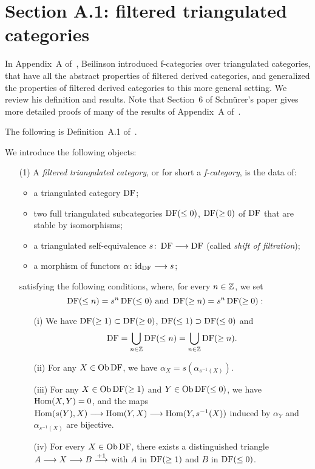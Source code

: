 \section{Section A.1: filtered triangulated categories}

In Appendix~A of~\cite{Be1}, Beilinson introduced f-categories over triangulated categories, that have all the abstract properties of filtered
derived categories, and generalized the properties of filtered derived categories to this more general setting. We review his definition and results.
Note that Section~6 of Schn\"urer's paper \cite{Schnur} gives more detailed proofs of many of the results of Appendix~A of~\cite{Be1}.

The following is Definition~A.1 of~\cite{Be1}.

\begin{definition}
We introduce the following objects:
\begin{itemize}
\item[(1)] A \textit{filtered} \textit{triangulated} \textit{category}, or for short a \emph{f-category}, is the data of:
\begin{itemize}
\item a triangulated category $\operatorname{DF}$;
\item two full triangulated subcategories $\operatorname{DF}(\leq 0)$, $\operatorname{DF}(\geq 0)$ of $\operatorname{DF}$ that are stable by isomorphisms;
\item a triangulated self-equivalence $s\colon \operatorname{DF}\longrightarrow\operatorname{DF}$ (called \emph{shift of filtration});
\item a morphism of functors $\alpha\colon \mathrm{id}_{\operatorname{DF}}\longrightarrow s$;

\end{itemize}
satisfying the following conditions, where, for every $n\in\mathbb{Z}$, we set
\[\operatorname{DF}(\leq n)=s^n\operatorname{DF}(\leq 0)\mbox{ and }\operatorname{DF}(\geq n)=s^n\operatorname{DF}(\geq 0):\]
\begin{itemize}
\item[(i)] We have $\operatorname{DF}(\geq 1)\subset\operatorname{DF}(\geq 0)$, $\operatorname{DF}(\leq 1)\supset\operatorname{DF}(\leq 0)$ and
\[\operatorname{DF}=\bigcup_{n\in\mathbb{Z}}\operatorname{DF}(\leq n)=\bigcup_{n\in\mathbb{Z}}\operatorname{DF}(\geq n).\]
\item[(ii)] For any $X\in\operatorname{\mathrm{Ob}}\operatorname{DF}$, we have $\alpha_X=s(\alpha_{s^{-1}(X)})$.
\item[(iii)] For any $X\in\operatorname{\mathrm{Ob}}\operatorname{DF}(\geq 1)$ and $Y\in\operatorname{\mathrm{Ob}}\operatorname{DF}(\leq 0)$, we have $\operatorname{Hom}(X,Y)=0$, and the maps $\operatorname{Hom}(s(Y),X)\longrightarrow\operatorname{Hom}(Y,X)\longrightarrow\operatorname{Hom}(Y,s^{-1}(X))$ induced
by $\alpha_Y$ and $\alpha_{s^{-1}(X)}$ are bijective.
\item[(iv)] For every $X\in\operatorname{\mathrm{Ob}}\operatorname{DF}$, there exists a distinguished triangle $A\longrightarrow X\longrightarrow B\stackrel{+1}{\longrightarrow}$ with $A$ in $\operatorname{DF}(\geq 1)$ and $B$ in $\operatorname{DF}(\leq 0)$.
\end{itemize}


\end{itemize}
\end{definition}
